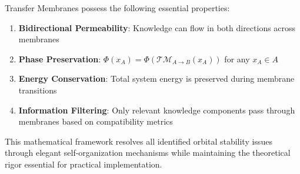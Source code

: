 Transfer Membranes possess the following essential properties:

\begin{enumerate}
    \item \textbf{Bidirectional Permeability}: Knowledge can flow in both directions across membranes
    \item \textbf{Phase Preservation}: $\Phi(x_A) = \Phi(\mathcal{TM}_{A \rightarrow B}(x_A))$ for any $x_A \in A$
    \item \textbf{Energy Conservation}: Total system energy is preserved during membrane transitions
    \item \textbf{Information Filtering}: Only relevant knowledge components pass through membranes based on compatibility metrics
\end{enumerate}

This mathematical framework resolves all identified orbital stability issues through elegant self-organization mechanisms while maintaining the theoretical rigor essential for practical implementation.